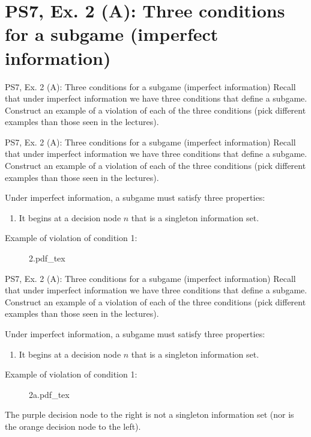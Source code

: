 \section{PS7, Ex. 2 (A): Three conditions for a subgame (imperfect information)}

\begin{frame}{PS7, Ex. 2 (A): Three conditions for a subgame (imperfect information)}
  Recall that under imperfect information we have three conditions that define a subgame. Construct an example of a violation of each of the three conditions (pick different examples than those seen in the lectures).
  \vfill\null
\end{frame}

\begin{frame}{PS7, Ex. 2 (A): Three conditions for a subgame (imperfect information)}
  Recall that under imperfect information we have three conditions that define a subgame. Construct an example of a violation of each of the three conditions (pick different examples than those seen in the lectures).
  \begin{multicols}{2}
    Under imperfect information, a subgame must satisfy three properties:
    \begin{enumerate}
      \item It begins at a decision node $n$ that is a singleton information set.
    \end{enumerate}
    \vfill\null\columnbreak
    Example of violation of condition 1:
    \vspace{-4pt}
    \begin{figure}[!h]
      \center
      \def\svgwidth{\columnwidth}
      {2.pdf_tex}
    \end{figure}
    \vfill\null
  \end{multicols}
\end{frame}
\begin{frame}{PS7, Ex. 2 (A): Three conditions for a subgame (imperfect information)}
  Recall that under imperfect information we have three conditions that define a subgame. Construct an example of a violation of each of the three conditions (pick different examples than those seen in the lectures).
  \begin{multicols}{2}
    Under imperfect information, a subgame must satisfy three properties:
    \begin{enumerate}
      \item It begins at a decision node $n$ that is a singleton information set.
    \end{enumerate}
    \vfill\null\columnbreak
    Example of violation of condition 1:
    \vspace{-12pt}
    \begin{figure}[!h]
      \center
      \def\svgwidth{1.1\columnwidth}
      {2a.pdf_tex}
    \end{figure}
    The purple decision node to the right is not a singleton information set (nor is the orange decision node to the left).
    \vfill\null
  \end{multicols}
\end{frame}

